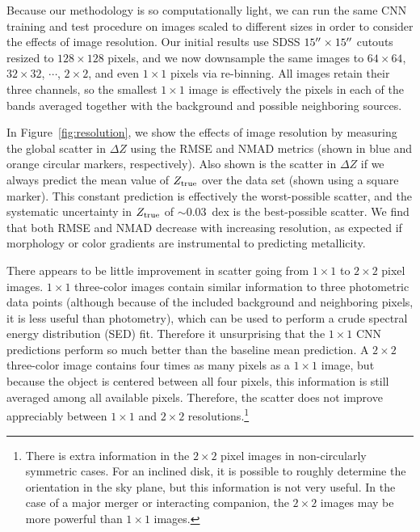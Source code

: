 \documentclass[fleqn,usenatbib]{mnras}
\begin{document}
Because our methodology is so computationally light, we can run the same CNN training and test procedure on images scaled to different sizes in order to consider the effects of image resolution. Our initial results use SDSS $15\hbox{$^{\prime\prime}$} \times 15 \hbox{$^{\prime\prime}$}$ cutouts resized to $128\times 128$ pixels, and we now downsample the same images to $64\times 64$, $32 \times 32$, $\cdots$, $2\times 2$, and even $1\times 1$ pixels via re-binning. All images retain their three channels, so the smallest $1 \times 1$ image is effectively the pixels in each of the \sdssi\sdssr\sdssg{} bands averaged together with the background and possible neighboring sources.

In Figure~\ref{fig:resolution}, we show the effects of image resolution by measuring the global scatter in $\Delta Z$ using the RMSE and NMAD metrics (shown in blue and orange circular markers, respectively). Also shown is the scatter in $\Delta Z$ if we always predict the mean value of $Z_{\rm true}$ over the data set (shown using a square marker). This constant prediction is effectively the worst-possible scatter, and the \cite{Tremonti2004} systematic uncertainty in $Z_{\rm true}$ of $\sim 0.03$~dex is the best-possible scatter. We find that both RMSE and NMAD decrease with increasing resolution, as expected if morphology or color gradients are instrumental to predicting metallicity.

There appears to be little improvement in scatter going from $1 \times 1$ to $2\times 2$ pixel images. $1\times 1$ three-color images contain similar information to three photometric data points (although because of the included background and neighboring pixels, it is less useful than photometry), which can be used to perform a crude spectral energy distribution (SED) fit.
Therefore it unsurprising that the $1 \times 1$ CNN predictions perform so much better than the baseline mean prediction. A $2 \times 2$ three-color image contains four times as many pixels as a $1\times 1$ image, but because the object is centered between all four pixels, this information is still averaged among all available pixels. Therefore, the scatter does not improve appreciably between $1 \times 1$ and $2 \times 2$ resolutions.\footnote{There is extra information in the $2\times 2$ pixel images in non-circularly symmetric cases. For an inclined disk, it is possible to roughly determine the orientation in the sky plane, but this information is not very useful. In the case of a major merger or interacting companion, the $2\times 2$ images may be more powerful than $1 \times 1$ images.}
\end{document}
